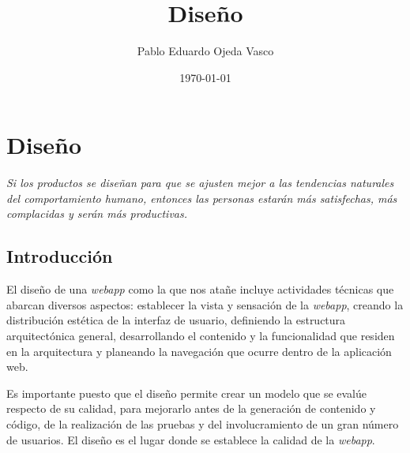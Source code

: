 \documentclass[a4paper,oneside,11pt]{book}
\begin{document}
\title{Diseño}
\author{Pablo Eduardo Ojeda Vasco}
\date{\today}



	\maketitle
%
%
\chapter{Diseño} %
	\label{sec:diseno}


		\textit{Si los productos se diseñan para que se ajusten mejor a las tendencias naturales del comportamiento humano, entonces las personas estarán más satisfechas, más complacidas y serán más productivas.}
		
	\section{Introducción} %
	\label{sec:introduccion}
	
		El diseño de una \textit{webapp} como la que nos atañe incluye actividades técnicas que abarcan diversos aspectos: establecer la vista y sensación de la \textit{webapp}, creando la distribución estética de la interfaz de usuario, definiendo la estructura arquitectónica general, desarrollando el contenido y la funcionalidad que residen en la arquitectura y planeando la navegación que ocurre dentro de la aplicación web.
		
		Es importante puesto que el diseño permite crear un modelo que se evalúe respecto de su calidad, para mejorarlo antes de la generación de contenido y código, de la realización de las pruebas y del involucramiento de un gran número de usuarios. El diseño es el lugar donde se establece la calidad de la \textit{webapp}.
		
		
\end{document}
